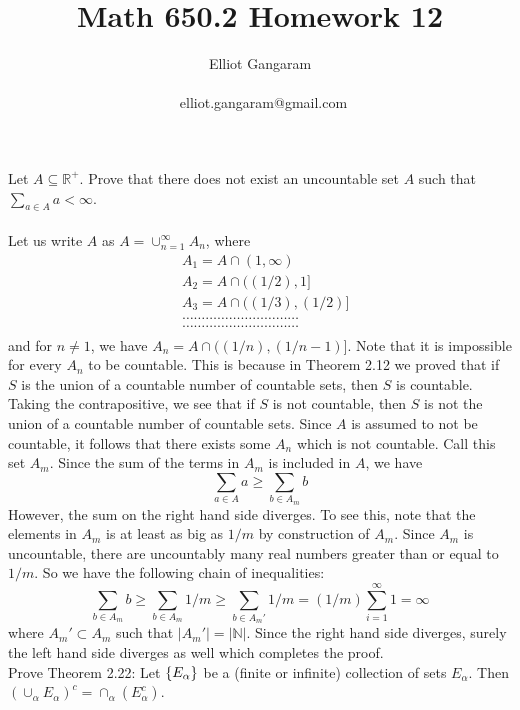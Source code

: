\documentclass[12pt]{article}
\title{Math 650.2 Homework 12}
\author{Elliot Gangaram\\
\date{}
\ elliot.gangaram@gmail.com \\}
\begin{document}
\maketitle

\problem Let $A \subseteq \mathbb{R}^{+}$. Prove that there does not exist an uncountable set $A$ such that $\sum_{a \in A} a < \infty $. \\ \\
Let us write $A$ as $A= \cup_{n=1}^{\infty} A_{n}$, where 
\begin{align*}
& A_{1}= A \cap (1, \infty) \\
& A_{2}= A \cap \big( (1/2),1 \big] \\
& A_{3}= A \cap \big( (1/3), (1/2) \big] \\
& \ldots \ldots \ldots \ldots \ldots \ldots \ldots  \ldots \ldots \ldots \\
& \ldots \ldots \ldots \ldots \ldots \ldots \ldots  \ldots \ldots \ldots \\
\end{align*}
and for $n \neq 1$, we have $A_{n}= A \cap \big( (1/n), (1/n-1) \big]$. Note that it is impossible for every $A_{n}$ to be countable. This is because in Theorem 2.12 we proved that if $S$ is the union of a countable number of countable sets, then $S$ is countable. Taking the contrapositive, we see that if $S$ is not countable, then $S$ is not the union of a countable number of countable sets. Since $A$ is assumed to not be countable, it follows that there exists some $A_{n}$ which is not countable. Call this set $A_{m}$. Since the sum of the terms in $A_{m}$ is included in $A$, we have 
\begin{equation}
\sum_{a \in A} a \geq \sum_{b \in A_m} b
\end{equation}
However, the sum on the right hand side diverges. To see this, note that the elements in $A_{m}$ is at least as big as $1/m$ by construction of $A_{m}$. Since $A_{m}$ is uncountable, there are uncountably many real numbers greater than or equal to $1/m$. So we have the following chain of inequalities:
\begin{equation}
\sum_{b \in A_m} b \geq \sum_{b \in A_m} 1/m \geq \sum_{b \in A_m'} 1/m = (1/m) \sum_{i=1}^{\infty} 1 = \infty
\end{equation}
where $ A_m' \subset A_m$ such that $| A_m' | = |\mathbb{N}|$. Since the right hand side diverges, surely the left hand side diverges as well which completes the proof.  \\ 

\problem \indent  Prove Theorem 2.22: Let $\left\{E_{\alpha}\right\}$ be a (finite or infinite) collection of sets $E_{\alpha}$. Then $\left( \cup_{\alpha}E_{\alpha} \right)^{c} = \cap_{\alpha}\left(E^{c}_{\alpha} \right)$. \\ 
\end{document}
